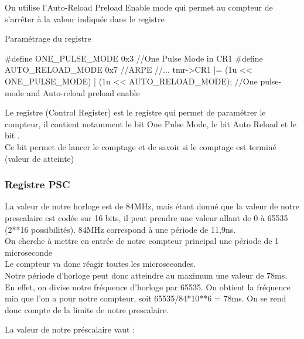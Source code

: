 {

On utilise l'Auto-Reload Preload Enable  mode qui permet au compteur de s'arrêter à la valeur indiquée dans le registre 


\begin{Cpp}{Paramétrage du registre } 

#define ONE_PULSE_MODE 0x3 //One Pulse Mode in CR1
#define AUTO_RELOAD_MODE 0x7 //ARPE
//...
tmr->CR1 |=  (1u << ONE_PULSE_MODE) | (1u << AUTO_RELOAD_MODE);		//One pulse-mode and Auto-reload preload enable
\end{Cpp}

Le registre  (Control Register) est le registre qui permet de paramétrer le compteur, il contient notamment le bit One Pulse Mode, le bit Auto Reload et le bit .\\
Ce bit permet de lancer le comptage et de savoir si le comptage est terminé (valeur de  atteinte)







\newpage
\subsubsection{Registre PSC}


La valeur de notre horloge est de 84MHz, mais étant donné que la valeur de notre prescalaire est codée sur 16 bits, il peut prendre une valeur allant de 0 à 65535 (2**16 possibilités). 
84MHz correspond à une période de 11,9ns. \\On cherche à mettre en entrée de notre compteur principal une période de 1 microseconde\\
Le compteur va donc réagir toutes les microsecondes.\\

Notre période d'horloge peut donc atteindre au maximum une valeur de 78ms. En effet, on divise notre fréquence d'horloge par 65535. 
On obtient la fréquence min que l'on a pour notre compteur, soit 65535/84*10**6 = 78ms.
On se rend donc compte de la limite de notre prescalaire.

La valeur de notre préscalaire vaut : 

}
